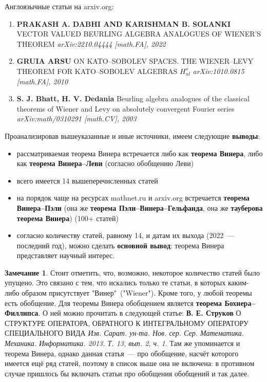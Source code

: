 \documentclass[12pt]{extarticle}
\theoremstyle{definition}
\newtheorem*{remark}{\indent Замечание}
\begin{document}
  	Англоязычные статьи на arxiv.org:
  	\begin{enumerate}
		\item \textbf{PRAKASH A. DABHI AND KARISHMAN B. SOLANKI} VECTOR VALUED BEURLING ALGEBRA ANALOGUES OF WIENER’S THEOREM \textit{arXiv:2210.04444 [math.FA], 2022}
		\item \textbf{GRUIA ARSU} ON KATO--SOBOLEV SPACES. THE WIENER--LEVY THEOREM FOR KATO--SOBOLEV ALGEBRAS $H^s_{ul}$ \textit{arXiv:1010.0815 [math.FA], 2010}
		\item \textbf{S. J. Bhatt, H. V. Dedania} Beurling algebra analogues of the classical theorems of Wiener and Levy on absolutely convergent Fourier series \textit{arXiv:math/0310291 [math.CV], 2003}
  	\end{enumerate}

  	Проанализировав вышеуказанные и иные источники, имеем следующие \textbf{выводы}:
 	\begin{itemize}
		\item рассматриваемая теорема Винера встречается либо как \textbf{теорема Винера}, либо как \textbf{теорема Винера--Леви} (согласно обобщению Леви)
		\item всего имеется 14 вышеперечисленных статей
		\item на порядок чаще на ресурсах mathnet.ru и arxiv.org встречается \textbf{теорема Винера--Пэли} (она же \textbf{теорема Пэли--Винера--Гельфанда}, она же \textbf{тауберова теорема Винера}) (100+ статей)
		\item согласно количеству статей, равному 14, и датам их выхода (2022~--- последний год), можно сделать \textbf{основной вывод}: теорема Винера представляет научный интерес.
	\end{itemize}
  	\begin{remark}
          Стоит отметить, что, возможно, некоторое количество статей было упущено. Это связано с тем, что искались только те статьи, в которых каким-либо образом присутствует "Винер"\ ("Wiener"). Кроме того, у любой теоремы есть обобщение. Для теоремы Винера обобщением является \textbf{теорема Бохнера--Филлипса}. О ней можно прочитать в следующей статье: \textbf{В. Е. Струков} О СТРУКТУРЕ ОПЕРАТОРА, ОБРАТНОГО К ИНТЕГРАЛЬНОМУ ОПЕРАТОРУ СПЕЦИАЛЬНОГО ВИДА \textit{Изв. Сарат. ун-та. Нов. сер. Сер. Математика. Механика. Информатика. 2013. Т. 13, вып. 2, ч. 1}. Там же упоминается и теорема Винера, однако данная статья~--- про обобщение, насчёт которого имеется ещё ряд статей, поэтому в список выше она не включена: в противном случае пришлось бы включать статьи про обобщения обобщений и так далее.
      \end{remark}
\end{document}
